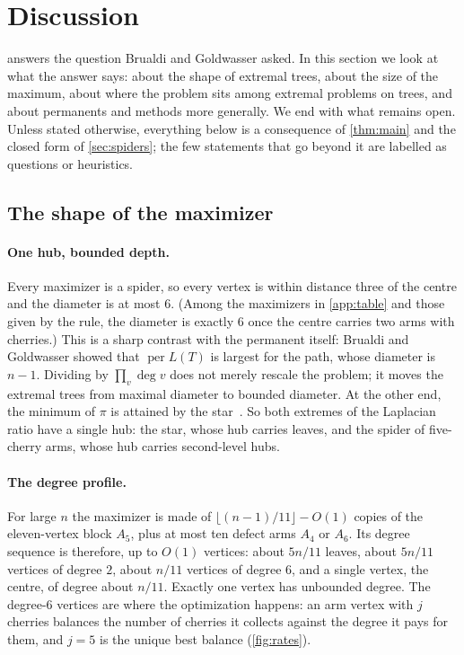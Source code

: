 \documentclass[11pt]{article}
\theoremstyle{definition}
\newcommand{\per}{\operatorname{per}}
\renewcommand{\deg}{\operatorname{deg}}
\begin{document}
\section{Discussion}\label{sec:discussion}

 answers the question Brualdi and Goldwasser asked. In this section we look at what the
answer says: about the shape of extremal trees, about the size of the maximum, about where the problem
sits among extremal problems on trees, and about permanents and methods more generally. We end with
what remains open. Unless stated otherwise, everything below is a consequence of \cref{thm:main} and the
closed form of \cref{sec:spiders}; the few statements that go beyond it are labelled as questions or
heuristics.

\subsection{The shape of the maximizer}

\paragraph{One hub, bounded depth.} Every maximizer is a spider, so every vertex is within distance
three of the centre and the diameter is at most $6$. (Among the maximizers in \cref{app:table} and those
given by the rule, the diameter is exactly $6$ once the centre carries two arms with cherries.) This is
a sharp contrast with the permanent itself: Brualdi and Goldwasser showed that $\per L(T)$ is largest for
the path, whose diameter is $n-1$. Dividing by $\prod_v\deg v$ does not merely rescale the problem; it
moves the extremal trees from maximal diameter to bounded diameter. At the other end, the minimum of
$\pi$ is attained by the star~\cite{BG1984}. So both extremes of the Laplacian ratio have a single hub:
the star, whose hub carries leaves, and the spider of five-cherry arms, whose hub carries second-level
hubs.

\paragraph{The degree profile.} For large $n$ the maximizer is made of $\lfloor(n-1)/11\rfloor-O(1)$
copies of the eleven-vertex block $A_5$, plus at most ten defect arms $A_4$ or $A_6$. Its degree sequence is
therefore, up to $O(1)$ vertices: about $5n/11$ leaves, about $5n/11$ vertices of degree $2$, about $n/11$
vertices of degree $6$, and a single vertex, the centre, of degree about $n/11$. Exactly one vertex has
unbounded degree. The degree-$6$ vertices are where the optimization happens: an arm vertex with $j$
cherries balances the number of cherries it collects against the degree it pays for them, and $j=5$ is
the unique best balance (\cref{fig:rates}).
\end{document}
